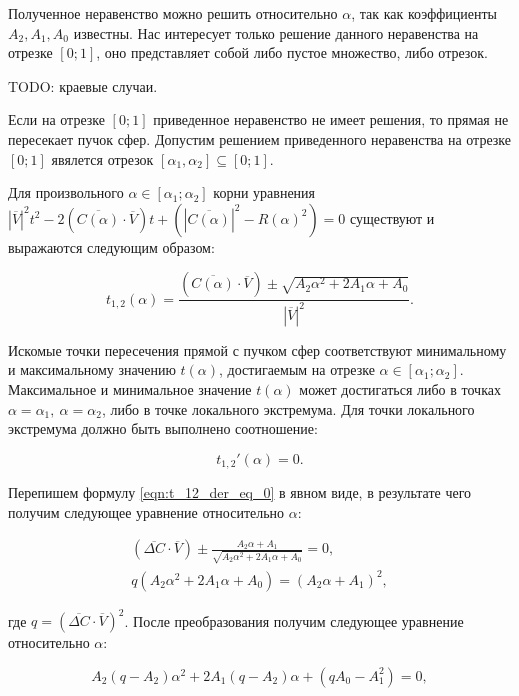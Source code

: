 \documentclass[a4paper,10pt]{extarticle}                     %
\numberwithin{equation}{section}                             %
\numberwithin{figure}{section}                               %
\theoremstyle{plain}                                         %
\begin{document}
Полученное неравенство можно решить относительно $\alpha$, так как коэффициенты $A_2, A_1, A_0$ известны.
Нас интересует только решение данного неравенства на отрезке $[0; 1]$, оно представляет собой либо пустое множество, либо отрезок.

TODO: краевые случаи.

Если на отрезке $[0; 1]$ приведенное неравенство не имеет решения, то прямая не пересекает пучок сфер.
Допустим решением приведенного неравенства на отрезке $[0; 1]$ явялется отрезок $[\alpha_1, \alpha_2] \subseteq [0; 1]$.

Для произвольного $\alpha \in [\alpha_1; \alpha_2]$ корни уравнения ${|\overline{V}|}^2t^2 - 2(\overline{C(\alpha)}\cdot\overline{V})t + ({|\overline{C(\alpha)}|}^2 - R(\alpha)^2) = 0$ существуют и выражаются следующим образом:

\begin{equation}
    t_{1,2}(\alpha) = \frac{(\overline{C(\alpha)}\cdot\overline{V}) \pm \sqrt{A_2\alpha^2 + 2A_1\alpha + A_0}}{|\overline{V}|^2}.
\end{equation}

Искомые точки пересечения прямой с пучком сфер соответствуют минимальному и максимальному значению $t(\alpha)$, достигаемым на отрезке $\alpha \in [\alpha_1; \alpha_2]$.
Максимальное и минимальное значение $t(\alpha)$ может достигаться либо в точках $\alpha = \alpha_1, \ \alpha = \alpha_2$, либо в точке локального экстремума.
Для точки локального экстремума должно быть выполнено соотношение:

\begin{equation}\label{eqn:t_12_der_eq_0}
    t_{1,2}'(\alpha) = 0.
\end{equation}

Перепишем формулу \ref{eqn:t_12_der_eq_0} в явном виде, в результате чего получим следующее уравнение относительно $\alpha$:

\begin{eqnarray}
    (\overline{\Delta C}\cdot\overline{V}) \pm \frac{A_2\alpha + A_1}{\sqrt{A_2\alpha^2 + 2A_1\alpha + A_0}} = 0, \\
    q(A_2\alpha^2 + 2A_1\alpha + A_0) = (A_2\alpha + A_1)^2,
\end{eqnarray}

где $q = (\overline{\Delta C}\cdot\overline{V})^2$.
После преобразования получим следующее уравнение относительно $\alpha$:

\begin{equation}\label{eqn:alpha_eqn}
    A_2(q - A_2)\alpha^2 + 2A_1(q - A_2)\alpha + (qA_0 - A_1^2) = 0,
\end{equation}
\end{document}
